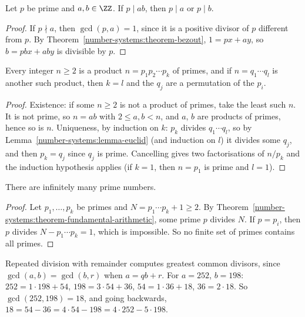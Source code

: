 \begin{lemma}[Euclid]\label{number-systems:lemma-euclid}
Let $p$ be prime and $a, b \in \ZZ$. If $p \mid ab$, then $p \mid a$ or $p \mid b$.
\end{lemma}

\begin{proof}
If $p \nmid a$, then $\gcd(p, a) = 1$, since it is a positive divisor of $p$
different from $p$. By Theorem~\ref{number-systems:theorem-bezout},
$1 = px + ay$, so $b = pbx + aby$ is divisible by $p$.
\end{proof}

\begin{theorem}\label{number-systems:theorem-fundamental-arithmetic}
Every integer $n \geq 2$ is a product $n = p_1 p_2 \cdots p_k$ of primes, and if
$n = q_1 \cdots q_l$ is another such product, then $k = l$ and the $q_j$ are a
permutation of the $p_i$.
\end{theorem}

\begin{proof}
Existence: if some $n \geq 2$ is not a product of primes, take the least such
$n$. It is not prime, so $n = ab$ with $2 \leq a, b < n$, and $a$, $b$ are products
of primes, hence so is $n$. Uniqueness, by induction on $k$: $p_k$ divides
$q_1 \cdots q_l$, so by Lemma~\ref{number-systems:lemma-euclid} (and induction on
$l$) it divides some $q_j$, and then $p_k = q_j$ since $q_j$ is prime. Cancelling
gives two factorisations of $n/p_k$ and the induction hypothesis applies (if
$k = 1$, then $n = p_1$ is prime and $l = 1$).
\end{proof}

\begin{theorem}[Euclid]\label{number-systems:theorem-infinitely-many-primes}
There are infinitely many prime numbers.
\end{theorem}

\begin{proof}
Let $p_1, \ldots, p_k$ be primes and $N = p_1 \cdots p_k + 1 \geq 2$. By
Theorem~\ref{number-systems:theorem-fundamental-arithmetic}, some prime $p$
divides $N$. If $p = p_i$, then $p$ divides $N - p_1 \cdots p_k = 1$, which is
impossible. So no finite set of primes contains all primes.
\end{proof}

\begin{example}\label{number-systems:example-euclidean-algorithm}
Repeated division with remainder computes greatest common divisors, since
$\gcd(a, b) = \gcd(b, r)$ when $a = qb + r$. For $a = 252$, $b = 198$:
$252 = 1 \cdot 198 + 54$, $198 = 3 \cdot 54 + 36$, $54 = 1 \cdot 36 + 18$,
$36 = 2 \cdot 18$. So $\gcd(252, 198) = 18$, and going backwards,
$18 = 54 - 36 = 4 \cdot 54 - 198 = 4 \cdot 252 - 5 \cdot 198$.
\end{example}

